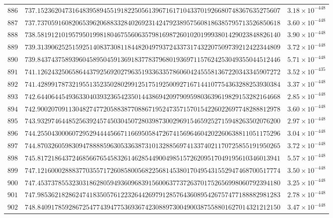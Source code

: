 \documentclass[12pt,reqno]{amsart}
\theoremstyle{remark}
\begin{document}
\begin{longtable}{clc}
$886$ & $737.1523620473164839589455191822505613967161710433701926680748367635275607$ & $3.18\times 10^{-448}$ \\
$887$ & $737.7370591608206539620688332840269231424792389575608186385795713526850618$ & $3.60\times 10^{-448}$ \\
$888$ & $738.5819121019579501998180467556063579816987260102019993801429023848826140$ & $3.90\times 10^{-448}$ \\
$889$ & $739.3139062525159251408373081184482049793724337317432207509739212422344809$ & $3.72\times 10^{-448}$ \\
$890$ & $739.8437437589396045895045913691837783796801936971157624253049355044512446$ & $5.71\times 10^{-448}$ \\
$891$ & $741.1262432506586443792569202796351933633578606042455581367220343345907272$ & $3.52\times 10^{-435}$ \\
$892$ & $741.4289917873219551352350280299125175192500927167144107754363288253930384$ & $3.37\times 10^{-448}$ \\
$893$ & $742.6440644549363304039323654235014438694209790959803639619829153282164668$ & $2.85\times 10^{-448}$ \\
$894$ & $742.9002070911304827477205883877088671952473571570154226022697748288812978$ & $3.60\times 10^{-448}$ \\
$895$ & $743.9329746448525639245745030450728039873002969154659252715948263502076200$ & $2.97\times 10^{-448}$ \\
$896$ & $744.2550430006072952944445667116695058472674156964604202260638811051175296$ & $3.04\times 10^{-448}$ \\
$897$ & $744.8703260598309478888596305336387310132885697413374021170725855191950265$ & $3.72\times 10^{-448}$ \\
$898$ & $745.8172186437246856676545832614628544900498515726209517049195610346013941$ & $5.57\times 10^{-448}$ \\
$899$ & $747.1216000288837703557172608580056822568145380170495431552947468700517774$ & $3.50\times 10^{-448}$ \\
$900$ & $747.4537378553230318628059493609683915600637737263701752656998060792394180$ & $3.25\times 10^{-448}$ \\
$901$ & $747.9853621828624741835057612232644269791285764360895426757477188882981283$ & $2.78\times 10^{-448}$ \\
$902$ & $748.8409178592867254774394775369367423088973004900387558801627014321212150$ & $3.47\times 10^{-448}$ \\

\end{longtable}
\end{document}

